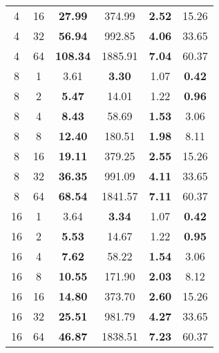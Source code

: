 \begin{table}[!ht]
\begin{tabular}{@{}cccccc@{}}
		4 & 16 & \textbf{27.99} & 374.99 & \textbf{2.52} & 15.26 \\ 
		4 & 32 & \textbf{56.94} & 992.85 & \textbf{4.06} & 33.65 \\ 
		4 & 64 & \textbf{108.34} & 1885.91 & \textbf{7.04} & 60.37 \\ \midrule
		8 & 1 & 3.61 & \textbf{3.30} & 1.07 & \textbf{0.42} \\ 
		8 & 2 & \textbf{5.47} & 14.01 & 1.22 & \textbf{0.96} \\ 
		8 & 4 & \textbf{8.43} & 58.69 & \textbf{1.53} & 3.06 \\ 
		8 & 8 & \textbf{12.40} & 180.51 & \textbf{1.98} & 8.11 \\ 
		8 & 16 & \textbf{19.11} & 379.25 & \textbf{2.55} & 15.26 \\ 
		8 & 32 & \textbf{36.35} & 991.09 & \textbf{4.11} & 33.65 \\ 
		8 & 64 & \textbf{68.54} & 1841.57 & \textbf{7.11} & 60.37 \\ \midrule
		16 & 1 & 3.64 & \textbf{3.34} & 1.07 & \textbf{0.42} \\ 
		16 & 2 & \textbf{5.53} & 14.67 & 1.22 & \textbf{0.95} \\ 
		16 & 4 & \textbf{7.62} & 58.22 & \textbf{1.54} & 3.06 \\ 
		16 & 8 & \textbf{10.55} & 171.90 & \textbf{2.03} & 8.12 \\ 
		16 & 16 & \textbf{14.80} & 373.70 & \textbf{2.60} & 15.26 \\ 
		16 & 32 & \textbf{25.51} & 981.79 & \textbf{4.27} & 33.65 \\ 
		16 & 64 & \textbf{46.87} & 1838.51 & \textbf{7.23} & 60.37 \\ \bottomrule
	\end{tabular}
\end{table}